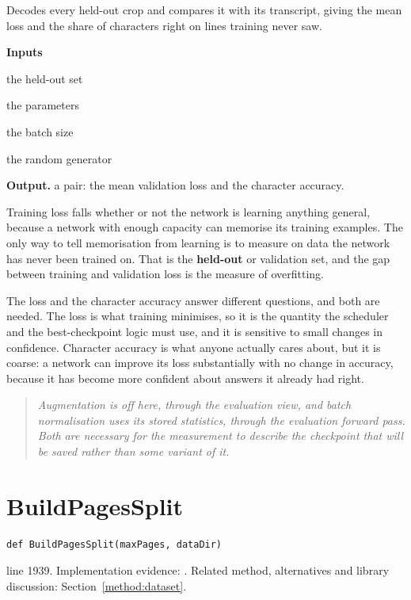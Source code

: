 Decodes every held-out crop and compares it with its transcript, giving the mean loss and the share of characters right on lines training never saw.




\noindent\textbf{Inputs}
\begin{description}[leftmargin=2.2em,style=nextline,font=\normalfont\ttfamily]\setlength\itemsep{1pt}
  \item[{valSet}] \normalfont the held-out set
  \item[{params}] \normalfont the parameters
  \item[{batchSize}] \normalfont the batch size
  \item[{rng}] \normalfont the random generator
\end{description}

\noindent\textbf{Output.} a pair: the mean validation loss and the character accuracy.


Training loss falls whether or not the network is learning anything general, because a network with enough capacity can memorise its training examples. The only way to tell memorisation from learning is to measure on data the network has never been trained on. That is the \textbf{held-out} or validation set, and the gap between training and validation loss is the measure of overfitting.


The loss and the character accuracy answer different questions, and both are needed. The loss is what training minimises, so it is the quantity the scheduler and the best-checkpoint logic must use, and it is sensitive to small changes in confidence. Character accuracy is what anyone actually cares about, but it is coarse: a network can improve its loss substantially with no change in accuracy, because it has become more confident about answers it already had right.


\begin{quote}\small\itshape Augmentation is off here, through the evaluation view, and batch normalisation uses its stored statistics, through the evaluation forward pass. Both are necessary for the measurement to describe the checkpoint that will be saved rather than some variant of it.\end{quote}


\section{BuildPagesSplit}\label{fn:train:BuildPagesSplit}
\begin{lstlisting}[style=sig]
def BuildPagesSplit(maxPages, dataDir)
\end{lstlisting}
 line 1939. Implementation evidence: \cite{code2026}. Related method, alternatives and library discussion: Section~\ref{method:dataset}.


